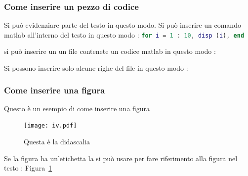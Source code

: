 \documentclass[10pt]{beamer}
\begin{document}
\begin{frame} \frametitle{Come inserire un pezzo di codice}
Si può evidenziare \alert{parte del testo} in questo modo.
%
Si può inserire un comando matlab all'interno del testo
in questo modo : \lstinline[language=Matlab]{for i = 1 : 10, disp (i), end}

si può inserire un un file contenete un codice matlab in questo modo :


Si possono inserire solo alcune righe del file in questo modo :


\end{frame}



\begin{frame} \frametitle{Come inserire una figura}
Questo è un esempio di come inserire una figura
\begin{figure}
    \centering
    \texttt{[image: iv.pdf]}
    \caption{Questa è la didascalia}
    \label{fig:my_label}
\end{figure}
Se la figura ha un'etichetta la si può usare per fare riferimento
alla figura nel testo : Figura~\ref{fig:my_label}
\end{frame}
\end{document}
